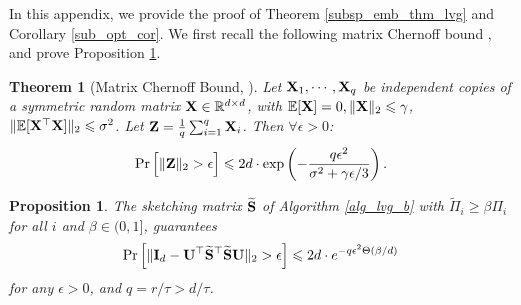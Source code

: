 \documentclass[journal,letterpaper,onecolumn,twoside,nofonttune]{IEEEtran}
\newcommand{\R}{\mathbb{R}}
\newcommand{\E}{\mathbb{E}}
\newcommand{\Ub}{\bold{U}}
\newcommand{\Ib}{\bold{I}}
\newcommand{\Sb}{\bold{S}}
\newcommand{\Sbwt}{\widetilde{\Sb}}
\newcommand{\Zb}{\bold{Z}}
\newcommand{\Xb}{\bold{X}}
\newcommand{\Pit}{\tilde{\Pi}}
\newtheorem{Thm}{Theorem}
\newtheorem{Prop}{Proposition}
\begin{document}
In this appendix, we provide the proof of Theorem \ref{subsp_emb_thm_lvg} and Corollary \ref{sub_opt_cor}. We first recall the following matrix Chernoff bound \cite[Fact 1]{Woo14}, and prove Proposition \ref{prop_Sp_lvg}.

\begin{Thm}[Matrix Chernoff Bound, {\cite[Fact 1]{Woo14}}]
\label{matr_Chern}
  Let $\Xb_1,\cdots,\Xb_q$ be independent copies of a symmetric random matrix $\Xb\in\R^{d\times d}$, with $\E[\Xb]=0, \|\Xb\|_2\leqslant \gamma$, $\|\E[\Xb^\top\Xb]\|_2\leqslant \sigma^2$. Let $\Zb=\frac{1}{q}\sum_{i=1}^q\Xb_i$. Then $\forall\epsilon>0$:
  \begin{equation*}
  \label{matr_Chern_expr}
    \Pr\Big[\|\Zb\|_2>\epsilon\Big]\leqslant2d\cdot\exp\left(-\frac{q\epsilon^2}{\sigma^2+\gamma\epsilon/3}\right).
  \end{equation*}
\end{Thm}
\vspace{2mm}

\begin{Prop}
\label{prop_Sp_lvg}
The sketching matrix $\Sbwt$ of Algorithm \ref{alg_lvg_b} with $\Pit_i\geqslant \beta\Pi_i$ for all $i$ and $\beta\in(0,1]$, guarantees
\begin{equation}
\label{conc_lvg_b}
  \Pr\Big[\|\Ib_d-\Ub^\top\Sbwt^\top\Sbwt\Ub\|_2>\epsilon\Big] \leqslant 2d\cdot e^{-q\epsilon^2\Theta(\beta/d)}
\end{equation}
for any $\epsilon>0$, and $q=r/\tau>d/\tau$.
\end{Prop}
\end{document}
